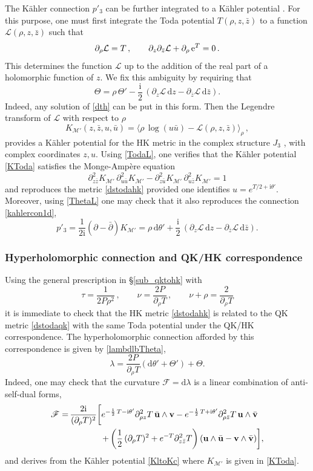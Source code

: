 \documentclass[12pt,reqno]{article}
\numberwithin{equation}{section}
\newcommand{\be}{\begin{equation}}
\newcommand{\ee}{\end{equation}}
\def\({\left(}
\def\){\right)}
\def\p{\partial}
\def\hf{\frac{1}{2}}
\def\bz{\bar z}
\def\bu{\bar u}
\newcommand{\de}{\mathrm{d}}
\newcommand{\I}{\mathrm{i}}
\newcommand{\cL}{\mathcal{L}}
\newcommand{\cM}{\mathcal{M}}
\newcommand{\fb}{\mathscr{F}}
\def\pa{\partial}
\newcommand{\kahler}{{K\"ahler}\xspace}
\def\ub{{\bf u}}
\def\vb{{\bf v}}
\def\phip{{\theta'}}
\def\kcon{p'_3}
\def\pTheta{\Theta'}
\def\pcM{\cM'}
\def\cff{\tau} %
\def\cfff{\nu} %
\def\Kc{K} %
\def\conhyper{\lambda}
\numberwithin{equation}{section}
\begin{document}
The \kahler connection $\kcon$ can be further integrated to a \kahler potential \cite{MR660020}.
For this purpose, one must first integrate the Toda
potential $T(\rho,z,\bz)$ to a function $\cL(\rho,z,\bz)$ such that
\be
\p_\rho\cL=T \, ,
\qquad
\p_{z} \p_{\bar z}  \cL+\p_ \rho \, {\rm e}^T = 0\, .
\label{TodaL}
\ee
This determines the function $\cL$ up to the addition of the real part of a holomorphic
function of $z$. We fix this ambiguity by requiring that
\be
\label{ThetaL}
\Theta=\rho\,\pTheta - \frac{\I}{2}\,\(\pa_z\cL\, \de z - \pa_{\bz}\cL \, \de\bar z\) .
\ee
Indeed, any solution of \eqref{dth} can be put in this form.
Then the Legendre transform of $\cL$ with respect to $\rho$
\be
\label{KToda}
\Kc_{\pcM}(z,\bz,u,\bu)= \langle \rho\, \log(u \bu) - \cL(\rho,z,\bz)\rangle_{\rho}\, ,
\ee
provides a K\"ahler potential for the HK metric in the complex structure $J_3$
\cite{MR660020}, with complex coordinates $z,u$.
Using \eqref{TodaL}, one verifies that
the \kahler potential \eqref{KToda} satisfies the Monge-Amp\`ere equation
\be
\pa_{z\bar z}^2 \Kc_{\pcM}\, \pa_{u\bu}^2 \Kc_{\pcM} - \pa_{z\bar u}^2 \Kc_{\pcM}\, \pa_{u\bar z}^2 \Kc_{\pcM}=1
\ee
and reproduces the metric \eqref{dstodahk} provided one identifies $u=e^{T/2+\I\phip}$.
Moreover, using \eqref{ThetaL} one may check that it also reproduces
the connection \eqref{kahlercon1d},
\be
\kcon = \frac{1}{2\I} (\pa-\bar\pa)\Kc_{\pcM} = \rho\, \de\phip
+\frac{\I}{2}\,\(\pa_z\cL\, \de z - \pa_{\bz}\cL \, \de\bar z\) .
\ee


\subsubsection{Hyperholomorphic connection and QK/HK correspondence}

Using the general prescription in \S\ref{sub_qktohk} with
\be
\cff=\frac{1}{2P\rho^2}\, ,
\qquad
\cfff=\frac{2P}{\pa_\rho T}\, ,
\qquad
\cfff+\rho=\frac{2}{\pa_\rho T}
\ee
it is immediate to check that  the HK metric \eqref{dstodahk}
is related to the QK metric \eqref{dstodaqk} with the same Toda
potential under the QK/HK correspondence. The hyperholomorphic
connection afforded by this correspondence is given by \eqref{lambdlbTheta},
\be
\label{hyperholcon1d}
\conhyper
=\frac{2P}{\pa_\rho T}  \left( \de \phip+\pTheta \right) + \Theta .
\ee
Indeed, one may check that the curvature $\fb=\de \conhyper$  is
a linear combination of anti-self-dual forms,
\be
\begin{split}
\fb=
 & \,\frac{2\I}{(\pa_\rho T)^2}\biggl[e^{-\hf\, T-\I\phip} \pa^2_{\rho z} T\, \bar\ub\wedge \vb
-  e^{-\hf\, T+\I\phip} \pa^2_{\rho\bar z} T \, \ub \wedge \bar\vb \biggr.
\\
&\biggl. \qquad\qquad
+\left( \hf\, (\pa_\rho T)^2+e^{-T}\pa^2_{z\bar z}T\right) (\ub\wedge \bar \ub- \vb\wedge \bar \vb)\biggr] ,
\end{split}
\ee
and derives from the \kahler potential \eqref{KltoKc} where $\Kc_{\pcM}$
is given in \eqref{KToda}.
\end{document}

